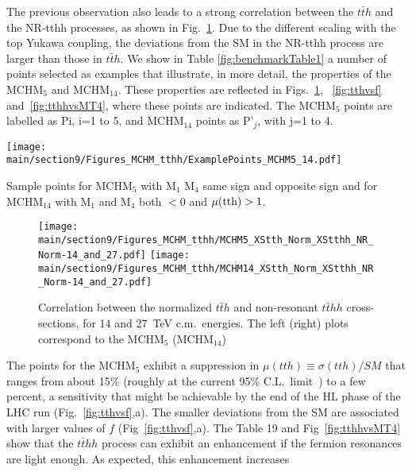 The previous observation also leads to a strong correlation between the $t\bar{t}h$ and the NR-tthh processes, as shown in Fig.~\ref{fig:nrtthhvstth}. Due to the different scaling with the top Yukawa coupling, the deviations from the SM in the NR-tthh process are larger than those in $t\bar{t}h$.
\label{benchmarks}
We show in Table \ref{fig:benchmarkTable1} 
a number of points selected as examples that illustrate, in
more detail, the properties of the MCHM$_5$ and MCHM$_{14}$.  
These properties are reflected in Figs.~\ref{fig:nrtthhvstth}, ~\ref{fig:tthvsf} and~\ref{fig:tthhvsMT4}, where these points are indicated. The MCHM$_5$ points are labelled as Pi, i=1 to 5, and MCHM$_{14}$ points as P'$_j$, with j=1 to 4.
%
\begin{table}[t]
\centering
\texttt{[image: \\main/section9/Figures\_MCHM\_tthh/ExamplePoints\_MCHM5\_14.pdf]}
\caption{Sample points for MCHM$_5$ with M$_1$ M$_4$ same sign and opposite sign and for MCHM$_{14}$ with M$_1$ and M$_4$ both $<0$ and $\mu({\rm tth})>1$.}
\label{fig:benchmarkTable1}
\end{table}
%
\begin{figure}[t]
\centering
\texttt{[image: \\main/section9/Figures\_MCHM\_tthh/MCHM5\_XStth\_Norm\_XStthh\_NR\_Norm-14\_and\_27.pdf]}
\hspace{1cm}
\texttt{[image: \\main/section9/Figures\_MCHM\_tthh/MCHM14\_XStth\_Norm\_XStthh\_NR\_Norm-14\_and\_27.pdf]}
\caption{Correlation between the normalized $t\bar{t}h$ and
non-resonant $t\bar{t}hh$ cross-sections, for 14 and 27~TeV c.m.~energies. The left (right) plots correspond to the MCHM$_5$ (MCHM$_{14}$)}
\label{fig:nrtthhvstth}
\end{figure}
%
The points for the MCHM$_5$ exhibit a suppression in $\mu(tth) \equiv
\sigma(tth)/SM$ that ranges from about 15\% (roughly at the current
95\% C.L.~limit~\cite{Aaboud:2018urx, Sirunyan:2018hoz}) to a few
percent, a sensitivity that might be achievable by the end of the HL
phase of the LHC run (Fig.~\ref{fig:tthvsf},a).  The smaller deviations from the SM are
associated with larger values of $f$ (Fig~\ref{fig:tthvsf},a).  The Table 19 and Fig~\ref{fig:tthhvsMT4} show that the
$t\bar{t}hh$ process can exhibit an enhancement if the fermion
resonances are light enough.  As expected, this enhancement increases
